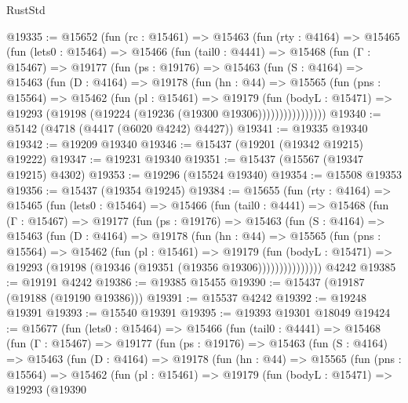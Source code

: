 \begin{lexlean}{RustStd}
\begin{coremodule}
@19335 := @15652
    (fun (rc : @15461) =>
    @15463
      (fun (rty : @4164) =>
      @15465
        (fun (lets0 : @15464) =>
        @15466
          (fun (tail0 : @4441) =>
          @15468
            (fun (Γ : @15467) =>
            @19177
              (fun (ps : @19176) =>
              @15463
                (fun (S : @4164) =>
                @15463
                  (fun (D : @4164) =>
                  @19178
                    (fun (hn : @44) =>
                    @15565
                      (fun (pns : @15564) =>
                      @15462
                        (fun (pl : @15461) =>
                        @19179
                          (fun (bodyL : @15471) =>
                          @19293 (@19198 (@19224 (@19236 (@19300 @19306))))))))))))))))
@19340 := @5142 (@4718 (@4417 (@6020 @4242) @4427))
@19341 := @19335 @19340
@19342 := @19209 @19340
@19346 := @15437 (@19201 (@19342 @19215) @19222)
@19347 := @19231 @19340
@19351 := @15437 (@15567 (@19347 @19215) @4302)
@19353 := @19296 (@15524 @19340)
@19354 := @15508 @19353
@19356 := @15437 (@19354 @19245)
@19384 := @15655
    (fun (rty : @4164) =>
    @15465
      (fun (lets0 : @15464) =>
      @15466
        (fun (tail0 : @4441) =>
        @15468
          (fun (Γ : @15467) =>
          @19177
            (fun (ps : @19176) =>
            @15463
              (fun (S : @4164) =>
              @15463
                (fun (D : @4164) =>
                @19178
                  (fun (hn : @44) =>
                  @15565
                    (fun (pns : @15564) =>
                    @15462
                      (fun (pl : @15461) =>
                      @19179
                        (fun (bodyL : @15471) =>
                        @19293 (@19198 (@19346 (@19351 (@19356 @19306)))))))))))))))
    @4242
@19385 := @19191 @4242
@19386 := @19385 @15455
@19390 := @15437 (@19187 (@19188 (@19190 @19386)))
@19391 := @15537 @4242
@19392 := @19248 @19391
@19393 := @15540 @19391
@19395 := @19393 @19301 @18049
@19424 := @15677
    (fun (lets0 : @15464) =>
    @15466
      (fun (tail0 : @4441) =>
      @15468
        (fun (Γ : @15467) =>
        @19177
          (fun (ps : @19176) =>
          @15463
            (fun (S : @4164) =>
            @15463
              (fun (D : @4164) =>
              @19178
                (fun (hn : @44) =>
                @15565
                  (fun (pns : @15564) =>
                  @15462
                    (fun (pl : @15461) =>
                    @19179
                      (fun (bodyL : @15471) =>
                      @19293
                        (@19390

\end{coremodule}
\end{lexlean}
